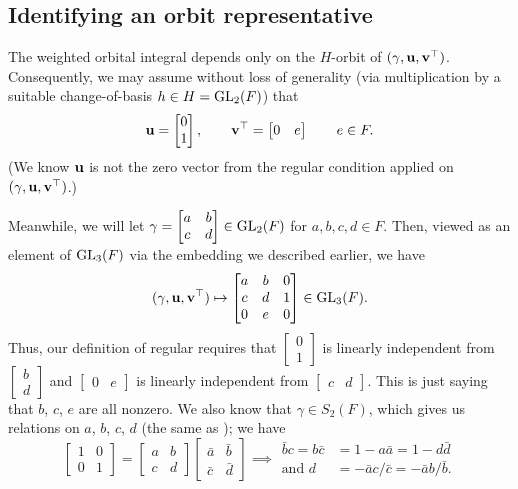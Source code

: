 \subsection{Identifying an orbit representative}
The weighted orbital integral depends only on the $H$-orbit of $(\gamma, \mathbf u, \mathbf v^\top)$.
Consequently, we may assume without loss of generality
(via multiplication by a suitable change-of-basis $h \in H = \operatorname{GL}_2(F)$) that
\[ \mathbf u = \begin{bmatrix} 0 \\ 1 \end{bmatrix}, \qquad
  \mathbf v^\top = \begin{bmatrix} 0 & e \end{bmatrix} \qquad e \in F. \]
(We know $\mathbf u$ is not the zero vector from the regular condition
applied on $(\gamma, \mathbf u, \mathbf v^\top)$.)

Meanwhile, we will let
$\gamma = \begin{bmatrix} a & b \\ c & d \end{bmatrix} \in \operatorname{GL}_2(F)$
for $a,b,c,d \in F$.
Then, viewed as an element of $\operatorname{GL}_3(F)$ via the embedding we described earlier, we have
\[
  (\gamma, \mathbf u, \mathbf v^\top)
  \mapsto \begin{bmatrix}
    a & b & 0 \\
    c & d & 1 \\
    0 & e & 0
  \end{bmatrix} \in \operatorname{GL}_3(F).
\]
Thus, our definition of regular requires that
$\begin{bmatrix} 0 \\ 1 \end{bmatrix}$
is linearly independent from $\begin{bmatrix} b \\ d \end{bmatrix}$
and
$\begin{bmatrix} 0 & e \end{bmatrix}$
is linearly independent from $\begin{bmatrix} c & d \end{bmatrix}$.
This is just saying that $b$, $c$, $e$ are all nonzero.
We also know that $\gamma \in S_2(F)$, which gives us relations on $a$, $b$, $c$, $d$
(the same as \cite[equation (7.3.2)]{ref:AFLspherical}); we have
\[
  \begin{bmatrix} 1 & 0 \\ 0 & 1 \end{bmatrix}
  = \begin{bmatrix} a & b \\ c & d \end{bmatrix} \begin{bmatrix} \bar a & \bar b \\ \bar c & \bar d \end{bmatrix}
  \implies
  \begin{aligned}
    \bar b c = b \bar c &= 1 - a \bar a = 1 - d \bar d \\
    \text{and } d &= - \bar a c / \bar c = -\bar a b / \bar b.
  \end{aligned}
\]

